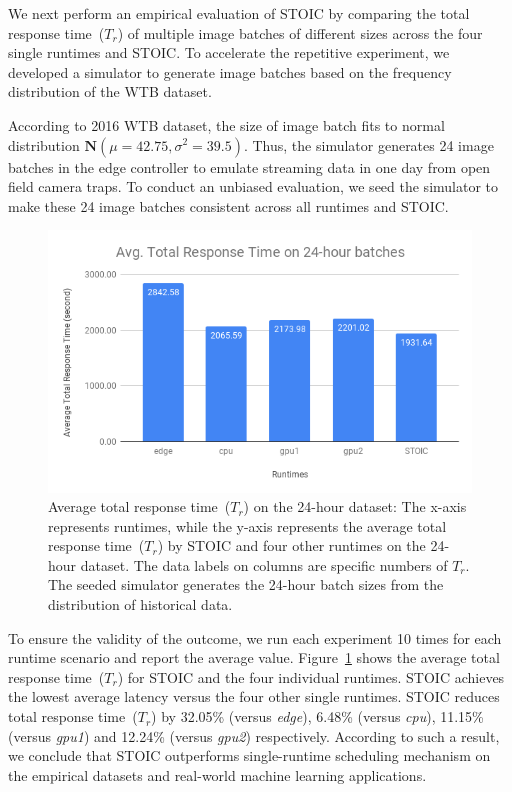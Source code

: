 %     


We next perform an empirical evaluation of STOIC by comparing the 
total response time~($T_r$) of multiple image batches of different
sizes across the four single runtimes and STOIC.  To accelerate the 
repetitive experiment, we developed a simulator to generate image batches based on the frequency distribution of the WTB dataset. 

According to 2016 WTB dataset, the size of image batch fits to normal distribution $\mathbf{N}(\mu = 42.75, \sigma^2 = 39.5)$. Thus, the simulator generates 24 image batches in the edge controller to emulate streaming data in one day from open field camera traps. To conduct an unbiased evaluation, we seed the simulator to make these 24 image batches consistent across all runtimes and STOIC. 

\begin{figure}[t] \centering 
\includegraphics[scale=0.42]{figures/24-batches}
\caption{Average total response time~($T_r$) on the 24-hour dataset: The x-axis represents runtimes, while the y-axis represents the average total response time~($T_r$) by STOIC and four other runtimes on the 24-hour dataset. The data labels on columns are specific numbers of $T_r$. The seeded simulator generates the 24-hour batch sizes from the distribution of historical data. 
\label{fig:24-batch}}
\end{figure}

To ensure the validity of the outcome, we run each experiment 10 times for each runtime scenario and report the average value. Figure~\ref{fig:24-batch} shows the average total response time~($T_r$) for STOIC and the four individual runtimes. STOIC achieves the lowest average latency versus the four other single runtimes.  STOIC reduces total response time~($T_r$) by 32.05\% (versus \textit{edge}), 6.48\% (versus \textit{cpu}), 11.15\% (versus \textit{gpu1}) and 12.24\% (versus \textit{gpu2}) respectively. According to such a result, we conclude that STOIC outperforms single-runtime scheduling mechanism on the empirical datasets and real-world machine learning applications.
